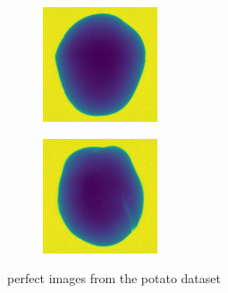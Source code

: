 \documentclass[11pt]{article}
\begin{document}
\begin{figure}[!h]
\begin{subfigure}[b]{0.22\textwidth}
         \caption{}
         \label{fig:perfect_17}
     \end{subfigure}
     \hfill
     \begin{subfigure}[b]{0.22\textwidth}
         \centering
         \includegraphics[width=\textwidth]{figurer/potato_dataset/perfect/perfect_18.jpg}
         \caption{}
         \label{fig:perfect_18}
     \end{subfigure}
     \hfill
     \begin{subfigure}[b]{0.22\textwidth}
         \centering
         \includegraphics[width=\textwidth]{figurer/potato_dataset/perfect/perfect_19.jpg}
         \caption{}
         \label{fig:perfect_19}
     \end{subfigure}
     \caption{perfect images from the potato dataset}
    \end{figure}
\end{document}
